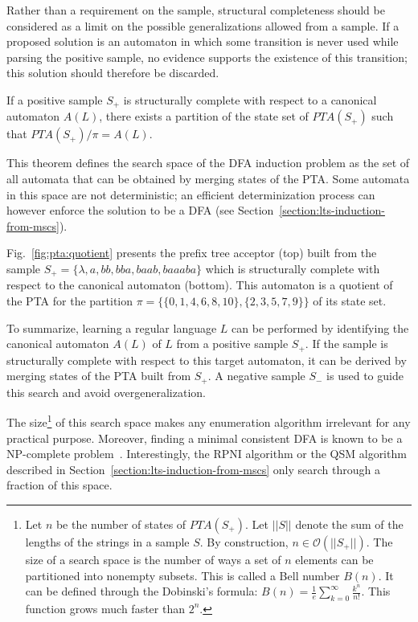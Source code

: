 Rather than a requirement on the sample, structural completeness should be considered as a limit on the possible generalizations allowed from a sample. If a proposed solution is an automaton in which some transition is never used while parsing the positive sample, no evidence supports the existence of this transition; this solution should therefore be discarded. 

\begin{theorem}
\label{search:theo}
If a positive sample $S_+$ is structurally complete with respect to a canonical automaton $A(L)$, there exists a partition of the state set of $PTA(S_+)$ such that $PTA(S_+)/\pi = A(L)$.
\end{theorem} 

This theorem defines the search space of the DFA induction problem as the set of all automata that can be obtained by merging states of the PTA. Some automata in this space are not deterministic; an efficient determinization process can however enforce the solution to be a DFA (see Section~\ref{section:lts-induction-from-mscs}).

Fig.~\ref{fig:pta:quotient} presents the prefix tree acceptor (top) built from the sample 
$S_+ = \{\lambda,a,bb,bba,baab,baaaba\}$ which is structurally complete with respect to the canonical automaton (bottom).
This automaton is a quotient of the PTA for the partition $\pi=\{\{0,1,4,6,8,10\},\{2,3,5,7,9\}\}$ of its state set.

To summarize, learning a regular language $L$ can be performed by identifying the canonical automaton $A(L)$ of $L$ from a positive sample $S_+$. If the sample is structurally complete with respect to this target automaton, it can be derived by merging states of the PTA built from $S_+$. A negative sample $S_-$ is used to guide this search and avoid overgeneralization. 

The size\footnote{Let $n$ be the number of states of $PTA(S_+)$. Let $||S||$ denote the sum of the lengths of the strings in a sample $S$. By construction, $n \in \mathcal{O}(||S_+||)$. The size of a search space is the number of ways a set of $n$ elements can be partitioned into nonempty subsets. This is called a Bell number $B(n)$. It can be defined through the Dobinski's formula: $B(n) = \frac{1}{e} \sum_{k=0}^{\infty} \frac{k^n}{n!}$. This function grows much faster than $2^n$.} of this search space makes any enumeration algorithm irrelevant for any practical purpose. Moreover, finding a minimal consistent DFA is known to be a NP-complete problem~\cite{Gold:1978,Angluin:1978}. Interestingly, the RPNI algorithm or the \textsc{QSM} algorithm described in Section~\ref{section:lts-induction-from-mscs} only search through a fraction of this space.


